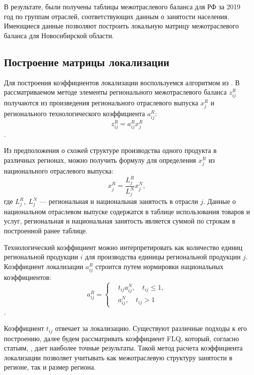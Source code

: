 \documentclass[12pt, a4paper]{article}
\begin{document}
В результате, были получены таблицы межотраслевого баланса для РФ за 2019 год по группам отраслей, соответствующих данным о занятости населения. Имеющиеся данные позволяют построить локальную матрицу межотраслевого баланса для Новосибирской области.

\subsection{Построение матрицы локализации}

Для построения коэффициентов локализации воспользуемся алгоритмом из 
\cite{MOBLoc}. 
В рассматриваемом методе элементы регионального межотраслевого баланса $z_{ij}^R$ получаются из произведения регионального отраслевого выпуска $x_j^R$ и регионального технологического коэффициента $a_{ij}^R$: $$z^R_{ij} = a^R_{ij} x_j^R$$. 

Из предположения о схожей структуре производства одного продукта в различных регионах, можно получить формулу для определения $x_{j}^R$ из национального отраслевого выпуска:
$$
x_j^R = \dfrac{L_j^R}{L_j^N}x_j^N,
$$
где $L_j^R,\ L_j^N$ --- региональная и национальная занятость в отрасли $j$. Данные о национальном отраслевом выпуске содержатся в таблице использования товаров и услуг, региональная и национальная занятость является суммой по строкам в построенной ранее таблице.

Технологический коэффициент можно интерпретировать как количество единиц региональной продукции $i$ для производства единицы региональной продукции $j$. 
Коэффициент локализации $a_{ij}^R$ строится путем нормировки национальных коэффициентов: 
$$a_{ij}^R = \left\{ \begin{aligned}&t_{ij}a_{ij}^N,\quad t_{ij} \leqslant 1,\\&a_{ij}^N,\quad t_{ij} > 1\end{aligned}\right.$$. 

Коэффициент $t_{ij}$ отвечает за локализацию. Существуют различные подходы к его построению, далее будем рассматривать коэффициент FLQ, который, согласно статьям, 
\cite{MOBAccur}, \cite{MOBMonteCarlo} 
дает наиболее точные результаты. Такой метод расчета коэффициента локализации позволяет учитывать как межотраслевую структуру занятости в регионе, так и размер региона.
\end{document}
